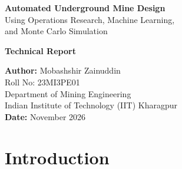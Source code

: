 \documentclass[12pt,a4paper]{article}
\begin{document}
\begin{titlepage}
\centering
\vspace*{2cm}

{\Huge\bfseries Automated Underground Mine Design}\\[0.5cm]
{\LARGE Using Operations Research, Machine Learning,\\and Monte Carlo Simulation}

\vspace{2cm}

{\Large\bfseries Technical Report}

\vspace{1.5cm}

{\large
\textbf{Author:} Mobashshir Zainuddin\\[0.2cm]
Roll No: 23MI3PE01\\[0.3cm]
Department of Mining Engineering\\
Indian Institute of Technology (IIT) Kharagpur\\[1cm]
\textbf{Date:} November 2026
}

\end{titlepage}

\begin{abstract}
\noindent
This report presents \textbf{MineOptima}, an integrated computational platform for automated underground gold mine design. The system combines Binary Integer Linear Programming (BILP) for stope layout optimization, Random Forest machine learning for grade prediction, Monte Carlo simulation for risk analysis, production scheduling with Discounted Cash Flow (DCF) NPV, and geotechnical stability assessment using the Mathews method. The platform models an Archean lode gold deposit with geologically realistic log-normal grade distribution (CV $\sim$180\%), nugget effect, and vein-hosted structures---calibrated against published parameters from Canadian Shield gold operations. Built with a Flask + Python backend and Plotly.js frontend, the system replaces weeks of manual mine design iteration with a pipeline that runs in under 60 seconds. This report details the methodology, implementation, results, and future research directions.
\end{abstract}

\newpage
\tableofcontents
\newpage

\section{Introduction}
\label{sec:introduction}
\end{document}
